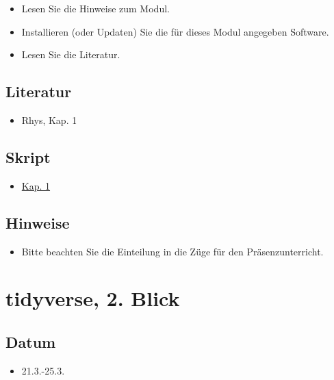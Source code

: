 \documentclass[
]{book}
\providecommand{\tightlist}{%
  \setlength{\itemsep}{0pt}\setlength{\parskip}{0pt}}
\begin{document}
\begin{itemize}
\tightlist
\item
  Lesen Sie die Hinweise zum Modul.
\item
  Installieren (oder Updaten) Sie die für dieses Modul angegeben Software.
\item
  Lesen Sie die Literatur.
\end{itemize}

\hypertarget{literatur-1}{%
\subsection{Literatur}\label{literatur-1}}

\begin{itemize}
\tightlist
\item
  Rhys, Kap. 1
\end{itemize}

\hypertarget{skript}{%
\subsection{Skript}\label{skript}}

\begin{itemize}
\tightlist
\item
  \href{}{Kap. 1}
\end{itemize}

\hypertarget{hinweise}{%
\subsection{Hinweise}\label{hinweise}}

\begin{itemize}
\tightlist
\item
  Bitte beachten Sie die Einteilung in die Züge für den Präsenzunterricht.
\end{itemize}

\hypertarget{tidyverse-2.-blick}{%
\section{tidyverse, 2. Blick}\label{tidyverse-2.-blick}}

\hypertarget{datum-1}{%
\subsection{Datum}\label{datum-1}}

\begin{itemize}
\tightlist
\item
  21.3.-25.3.
\end{itemize}
\end{document}
